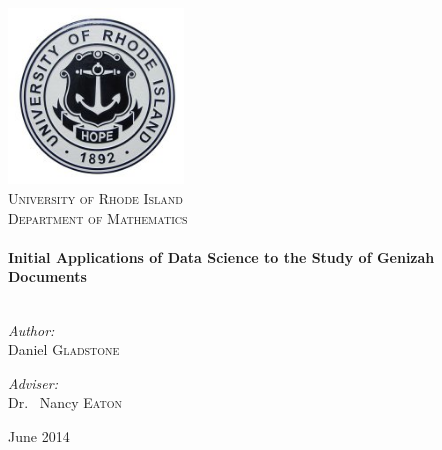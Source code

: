 
%
%
%

\begin{titlepage}
\begin{center}

\includegraphics[width=0.35\textwidth]{./logo}~\\[1cm]

\textsc{\LARGE University of Rhode Island}\\[1.5cm]

\textsc{\Large Department of Mathematics}\\[0.5cm]

\HRule \\[0.4cm]
{ \huge \bfseries Initial Applications of Data Science to the Study of Genizah Documents \\[0.4cm] }
%
\HRule \\[1.5cm]

\begin{minipage}{0.4\textwidth}
\begin{flushleft} \large
\emph{Author:}\\
Daniel \textsc{Gladstone}
\end{flushleft}
\end{minipage}
\begin{minipage}{0.4\textwidth}
\begin{flushright} \large
\emph{Adviser:} \\
Dr. ~Nancy \textsc{Eaton}
\end{flushright}
\end{minipage}

\vfill

{\large June 2014}

\end{center}
\end{titlepage}

